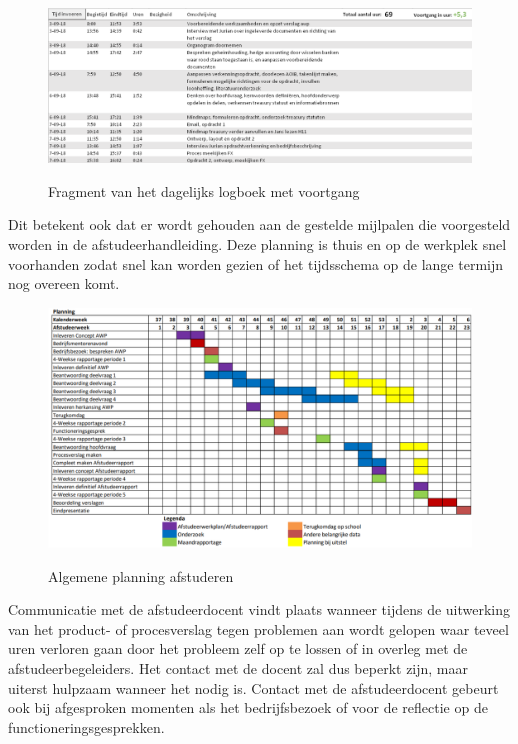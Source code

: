 \documentclass[10pt,a4paper,oneside]{report}
\begin{document}
\begin{figure}[ht]
    \centering
    \includegraphics[angle=0,width=\textwidth]{tijdsplanning}
    \label{fig:tijdsplanning}
    \caption{Fragment van het dagelijks logboek met voortgang}
\end{figure}

Dit betekent ook dat er wordt gehouden aan de gestelde mijlpalen die voorgesteld worden in de afstudeerhandleiding. Deze planning is thuis en op de werkplek snel voorhanden zodat snel kan worden gezien of het tijdsschema op de lange termijn nog overeen komt.

\begin{figure}[ht]
    \centering
    \includegraphics[angle=0,width=\textwidth]{planning}
    \label{fig:planning}
    \caption{Algemene planning afstuderen}
\end{figure}

Communicatie met de afstudeerdocent vindt plaats wanneer tijdens de uitwerking van het product- of procesverslag tegen problemen aan wordt gelopen waar teveel uren verloren gaan door het probleem zelf op te lossen of in overleg met de afstudeerbegeleiders. Het contact met de docent zal dus beperkt zijn, maar uiterst hulpzaam wanneer het nodig is. Contact met de afstudeerdocent gebeurt ook bij afgesproken momenten als het bedrijfsbezoek of voor de reflectie op de functioneringsgesprekken.
\end{document}
